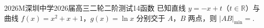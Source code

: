 
\begin{problem}{2026}{M}{深圳中学2026届高三二轮二阶测试}{14}{函数}
已知直线 $y=-x+t$（$t\in\mathbb{R}$）与曲线 $f(x)=x^2+x+1$，$g(x)=\ln x$ 分别交于 $A$，$B$ 两点，则 $|AB|_{\min}=$\underline{\hspace{4em}}.
\end{problem}